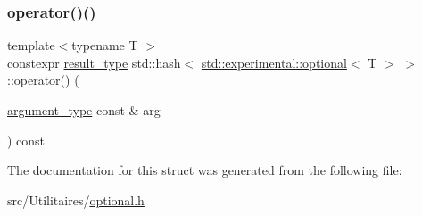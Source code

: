 \subsubsection{\texorpdfstring{operator()()}{operator()()}}
{\footnotesize\ttfamily template$<$typename T $>$ \\
constexpr \mbox{\hyperlink{structstd_1_1hash_3_01std_1_1experimental_1_1optional_3_01_t_01_4_01_4_a1ffc134496ff2e1dedb167899d460b6b}{result\+\_\+type}} std\+::hash$<$ \mbox{\hyperlink{classstd_1_1experimental_1_1optional}{std\+::experimental\+::optional}}$<$ T $>$ $>$\+::operator() (\begin{DoxyParamCaption}\item[{\mbox{\hyperlink{structstd_1_1hash_3_01std_1_1experimental_1_1optional_3_01_t_01_4_01_4_a990f41de75472068a98961bde97c9f6f}{argument\+\_\+type}} const \&}]{arg }\end{DoxyParamCaption}) const\hspace{0.3cm}{\ttfamily [inline]}}



The documentation for this struct was generated from the following file\+:\begin{DoxyCompactItemize}
\item 
src/\+Utilitaires/\mbox{\hyperlink{optional_8h}{optional.\+h}}\end{DoxyCompactItemize}
